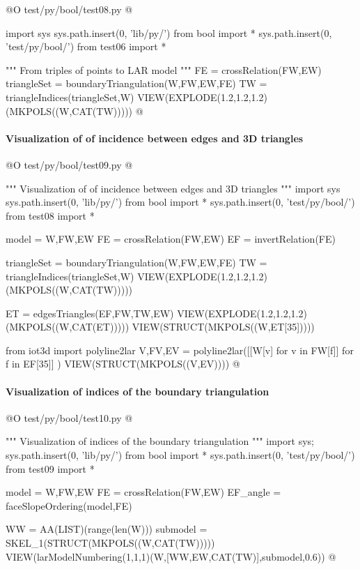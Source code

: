 \documentclass[11pt,oneside]{article}    %
\begin{document}
@O test/py/bool/test08.py @{
import sys
sys.path.insert(0, 'lib/py/')
from bool import *
sys.path.insert(0, 'test/py/bool/')
from test06 import *

""" From triples of points to LAR model """
FE = crossRelation(FW,EW)
triangleSet = boundaryTriangulation(W,FW,EW,FE)
TW = triangleIndices(triangleSet,W)
VIEW(EXPLODE(1.2,1.2,1.2)(MKPOLS((W,CAT(TW)))))
@}



\paragraph{Visualization of of incidence between edges and 3D triangles}

@O test/py/bool/test09.py @{
""" Visualization of of incidence between edges and 3D triangles """
import sys
sys.path.insert(0, 'lib/py/')
from bool import *
sys.path.insert(0, 'test/py/bool/')
from test08 import *

model = W,FW,EW
FE = crossRelation(FW,EW)
EF = invertRelation(FE)

triangleSet = boundaryTriangulation(W,FW,EW,FE)
TW = triangleIndices(triangleSet,W)
VIEW(EXPLODE(1.2,1.2,1.2)(MKPOLS((W,CAT(TW)))))

ET = edgesTriangles(EF,FW,TW,EW)
VIEW(EXPLODE(1.2,1.2,1.2)(MKPOLS((W,CAT(ET)))))
VIEW(STRUCT(MKPOLS((W,ET[35]))))

from iot3d import polyline2lar
V,FV,EV = polyline2lar([[W[v] for v in FW[f]] for f in EF[35]] )
VIEW(STRUCT(MKPOLS((V,EV))))
@}



\paragraph{Visualization of indices of the boundary triangulation}

@O test/py/bool/test10.py @{
""" Visualization of indices of the boundary triangulation """
import sys; sys.path.insert(0, 'lib/py/')
from bool import *
sys.path.insert(0, 'test/py/bool/')
from test09 import *

model = W,FW,EW
FE = crossRelation(FW,EW)
EF_angle = faceSlopeOrdering(model,FE)

WW = AA(LIST)(range(len(W)))
submodel = SKEL_1(STRUCT(MKPOLS((W,CAT(TW)))))
VIEW(larModelNumbering(1,1,1)(W,[WW,EW,CAT(TW)],submodel,0.6))
@}
\end{document}

